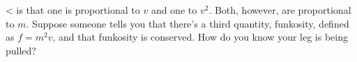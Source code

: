 <%
is that one is proportional to $v$ and one to $v^2$. Both, however, are proportional
to $m$. Suppose someone tells you that there's a third quantity, funkosity, defined
as $f=m^2v$, and that funkosity is conserved. How do you know your leg is being pulled?
